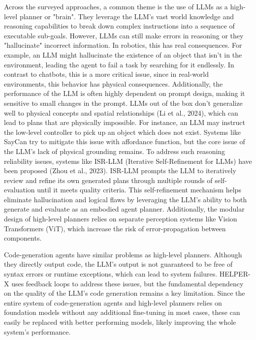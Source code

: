 \documentclass[11pt]{article}
\begin{document}
Across the surveyed approaches, a common theme is the use of LLMs as a high-level planner or "brain". They leverage the LLM's vast world knowledge and reasoning capabilities to break down complex instructions into a sequence of executable sub-goals. 
However, LLMs can still make errors in reasoning or they "hallucinate" incorrect information. In robotics, this has real consequences. For example, an LLM might hallucinate the existence of an object that isn't in the environment, leading the agent to fail a task by searching for it endlessly. In contrast to chatbots, this is a more critical issue, since in real-world environments, this behavior has physical consequences.
Additionally, the performance of the LLM is often highly dependent on prompt design, making it sensitive to small changes in the prompt. LLMs out of the box don't generalize well to physical concepts and spatial relationships (Li et al., 2024), which can lead to plans that are physically impossible. For instance, an LLM may instruct the low-level controller to pick up an object which does not exist. Systems like SayCan try to mitigate this issue with affordance function, but the core issue of the LLM's lack of physical grounding remains.
To address such reasoning reliability issues, systems like ISR-LLM (Iterative Self-Refinement for LLMs) have been proposed (Zhou et al., 2023). ISR-LLM prompts the LLM to iteratively review and refine its own generated plans through multiple rounds of self-evaluation until it meets quality criteria. This self-refinement mechanism helps eliminate hallucination and logical flaws by leveraging the LLM's ability to both generate and evaluate as an embodied agent planner.
Additionally, the modular design of high-level planners relies on separate perception systems like Vision Transformers (ViT), which increase the risk of error-propagation between components.

Code-generation agents have similar problems as high-level planners. Although they directly output code, the LLM's output is not guaranteed to be free of syntax errors or runtime exceptions, which can lead to system failures. HELPER-X uses feedback loops to address these issues, but the fundamental dependency on the quality of the LLM's code generation remains a key limitation. 
Since the entire system of code-generation agents and high-level planners relies on foundation models without any additional fine-tuning in most cases, these can easily be replaced with better performing models, likely improving the whole system's performance.
\end{document}
